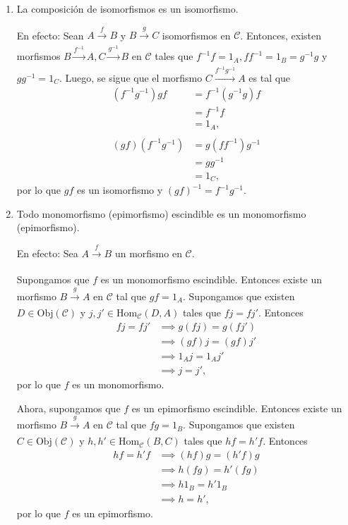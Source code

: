 \documentclass[tesis]{subfiles}
\begin{document}
\begin{Obs}
\begin{enumerate}[label=(\arabic*)]
        \item La composición de isomorfismos es un isomorfismo.

            En efecto: Sean $A\xrightarrow[]{f} B$ y $B\xrightarrow[]{g} C$ isomorfismos en $\mathscr{C}$. Entonces, existen morfismos $B\xrightarrow[]{f^{-1}} A, C\xrightarrow[]{g^{-1}} B$ en $\mathscr{C}$ tales que $f^{-1}f=1_A, ff^{-1}=1_B=g^{-1}g$ y $gg^{-1}=1_C$. Luego, se sigue que el morfismo $C\xrightarrow{f^{-1}g^{-1}} A$ es tal que
            \begin{align*}
                (f^{-1}g^{-1})gf &= f^{-1}(g^{-1}g)f \\
                                 &= f^{-1}f \\
                                 &= 1_A, \\ \\
                (gf)(f^{-1}g^{-1}) &= g(ff^{-1})g^{-1} \\
                                   &= gg^{-1} \\
                                   &= 1_C,
            \end{align*}
            por lo que $gf$ es un isomorfismo y $(gf)^{-1}=f^{-1}g^{-1}$.

        \item Todo monomorfismo (epimorfismo) escindible es un monomorfismo (epimorfismo).

            En efecto: Sea $A\xrightarrow[]{f} B$ un morfismo en $\mathscr{C}$.

            Supongamos que $f$ es un monomorfismo escindible. Entonces existe un morfismo $B\xrightarrow[]{g} A$ en $\mathscr{C}$ tal que $gf = 1_A$. Supongamos que existen $D\in\text{Obj}(\mathscr{C})$ y $j,j'\in\text{Hom}_\mathscr{C}(D,A)$ tales que $fj = fj'$. Entonces
            \begin{align*}
                fj = fj' &\implies g(fj) = g(fj') \\
                &\implies (gf)j = (gf)j' \\
                &\implies 1_A j = 1_A j' \\
                &\implies j = j',
            \end{align*}
            \noindent por lo que $f$ es un monomorfismo.

            Ahora, supongamos que $f$ es un epimorfismo escindible. Entonces existe un morfismo $B\xrightarrow[]{g} A$ en $\mathscr{C}$ tal que $fg = 1_B$. Supongamos que existen $C\in\text{Obj}(\mathscr{C})$ y $h,h'\in\text{Hom}_\mathscr{C}(B,C)$ tales que $hf = h'f$. Entonces
            \begin{align*}
                hf = h'f &\implies (hf)g = (h'f)g \\
                &\implies h(fg) = h'(fg) \\
                               &\implies h 1_B = h' 1_B \\
                               &\implies h = h',
            \end{align*}
            \noindent por lo que $f$ es un epimorfismo.


\end{enumerate}
\end{Obs}
\end{document}
